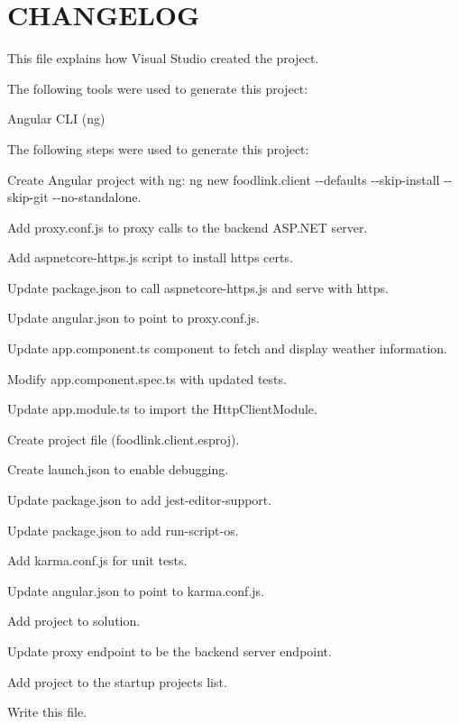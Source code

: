\chapter{CHANGELOG}
\hypertarget{md__d_1_2_g_i_t_2_food_link_2foodlink_8client_2_c_h_a_n_g_e_l_o_g}{}\label{md__d_1_2_g_i_t_2_food_link_2foodlink_8client_2_c_h_a_n_g_e_l_o_g}
This file explains how Visual Studio created the project.

The following tools were used to generate this project\+:
\begin{DoxyItemize}
\item Angular CLI (ng)
\end{DoxyItemize}

The following steps were used to generate this project\+:
\begin{DoxyItemize}
\item Create Angular project with ng\+: {\ttfamily ng new foodlink.\+client -\/-\/defaults -\/-\/skip-\/install -\/-\/skip-\/git -\/-\/no-\/standalone}.
\item Add {\ttfamily proxy.\+conf.\+js} to proxy calls to the backend ASP.\+NET server.
\item Add {\ttfamily aspnetcore-\/https.\+js} script to install https certs.
\item Update {\ttfamily package.\+json} to call {\ttfamily aspnetcore-\/https.\+js} and serve with https.
\item Update {\ttfamily angular.\+json} to point to {\ttfamily proxy.\+conf.\+js}.
\item Update {\ttfamily app.\+component.\+ts} component to fetch and display weather information.
\item Modify {\ttfamily app.\+component.\+spec.\+ts} with updated tests.
\item Update {\ttfamily app.\+module.\+ts} to import the Http\+Client\+Module.
\item Create project file ({\ttfamily foodlink.\+client.\+esproj}).
\item Create {\ttfamily launch.\+json} to enable debugging.
\item Update package.\+json to add {\ttfamily jest-\/editor-\/support}.
\item Update package.\+json to add {\ttfamily run-\/script-\/os}.
\item Add {\ttfamily karma.\+conf.\+js} for unit tests.
\item Update {\ttfamily angular.\+json} to point to {\ttfamily karma.\+conf.\+js}.
\item Add project to solution.
\item Update proxy endpoint to be the backend server endpoint.
\item Add project to the startup projects list.
\item Write this file. 
\end{DoxyItemize}